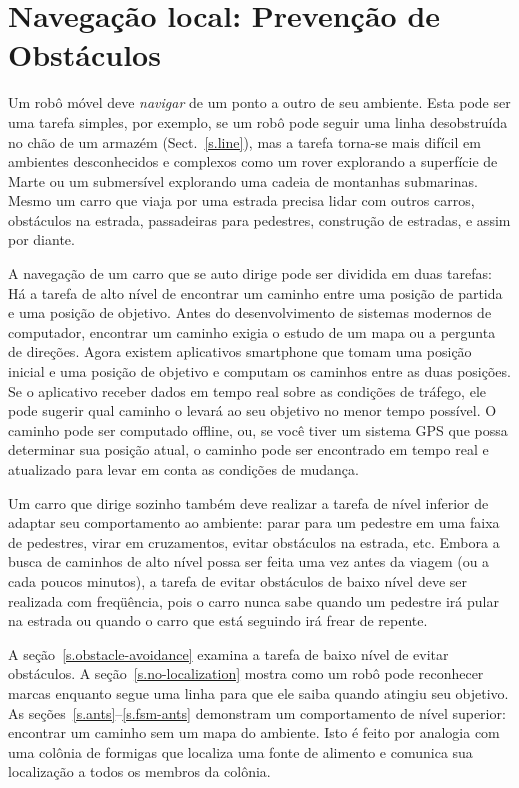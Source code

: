 
\chapter{Navegação local: Prevenção de Obstáculos}\label{ch.obstacle}

Um robô móvel deve \emph{navigar} de um ponto a outro de seu ambiente. Esta pode ser uma tarefa simples, por exemplo, se um robô pode seguir uma linha desobstruída no chão de um armazém (Sect.~\ref{s.line}), mas a tarefa torna-se mais difícil em ambientes desconhecidos e complexos como um rover explorando a superfície de Marte ou um submersível explorando uma cadeia de montanhas submarinas. Mesmo um carro que viaja por uma estrada precisa lidar com outros carros, obstáculos na estrada, passadeiras para pedestres, construção de estradas, e assim por diante. 

A navegação de um carro que se auto dirige pode ser dividida em duas tarefas: Há a tarefa de alto nível de encontrar um caminho entre uma posição de partida e uma posição de objetivo. Antes do desenvolvimento de sistemas modernos de computador, encontrar um caminho exigia o estudo de um mapa ou a pergunta de direções. Agora existem aplicativos smartphone que tomam uma posição inicial e uma posição de objetivo e computam os caminhos entre as duas posições. Se o aplicativo receber dados em tempo real sobre as condições de tráfego, ele pode sugerir qual caminho o levará ao seu objetivo no menor tempo possível. O caminho pode ser computado offline, ou, se você tiver um sistema GPS que possa determinar sua posição atual, o caminho pode ser encontrado em tempo real e atualizado para levar em conta as condições de mudança.

Um carro que dirige sozinho também deve realizar a tarefa de nível inferior de adaptar seu comportamento ao ambiente: parar para um pedestre em uma faixa de pedestres, virar em cruzamentos, evitar obstáculos na estrada, etc. Embora a busca de caminhos de alto nível possa ser feita uma vez antes da viagem (ou a cada poucos minutos), a tarefa de evitar obstáculos de baixo nível deve ser realizada com freqüência, pois o carro nunca sabe quando um pedestre irá pular na estrada ou quando o carro que está seguindo irá frear de repente.

A seção~\ref{s.obstacle-avoidance} examina a tarefa de baixo nível de evitar obstáculos. A seção~\ref{s.no-localization} mostra como um robô pode reconhecer marcas enquanto segue uma linha para que ele saiba quando atingiu seu objetivo. As seções~\ref{s.ants}--\ref{s.fsm-ants} demonstram um comportamento de nível superior: encontrar um caminho sem um mapa do ambiente. Isto é feito por analogia com uma colônia de formigas que localiza uma fonte de alimento e comunica sua localização a todos os membros da colônia.

